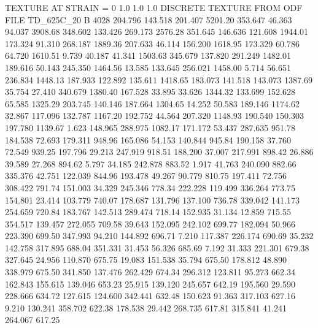 TEXTURE AT STRAIN = 0
1.0   1.0   1.0
DISCRETE TEXTURE FROM ODF FILE TD_625C_20
B 4028
 204.796  143.518  201.407      5201.20
 353.647   46.363   94.037      3908.68
 348.602  133.426  269.173      2576.28
 351.645  146.636  121.608      1944.01
 173.324   91.310  268.187      1889.36
 207.633   46.114  156.200      1618.95
 173.329   60.786   64.720      1610.51
   9.739   40.187   41.341      1503.63
 345.679  137.820  291.249      1482.01
 189.616   50.143  245.350      1464.56
  13.585  133.645  256.021      1458.00
   5.714   56.651  236.834      1448.13
 187.933  122.892  135.611      1418.65
 183.073  141.518  143.073      1387.69
  35.754   27.410  340.679      1380.40
 167.528   33.895   33.626      1344.32
 133.699  152.628   65.585      1325.29
 203.745  140.146  187.664      1304.65
  14.252   50.583  189.146      1174.62
  32.867  117.096  132.787      1167.20
 192.752   44.564  207.320      1148.93
 190.540  150.303  197.780      1139.67
   1.623  148.965  288.975      1082.17
 171.172   53.437  287.635       951.78
 184.538   72.693  179.311       948.96
 165.086   54.153  140.844       945.84
 190.158   37.760   72.549       939.25
 197.796   29.213  247.919       918.51
 188.200   37.007  217.991       898.42
  26.886   39.589   27.268       894.62
   5.797   34.185  242.878       883.52
   1.917   41.763  240.090       882.66
 335.376   42.751  122.039       844.96
 193.478   49.267   90.779       810.75
 197.411   72.756  308.422       791.74
 151.003   34.329  245.346       778.34
 222.228  119.499  336.264       773.75
 154.801   23.414  103.779       740.07
 178.687  131.796  137.100       736.78
 339.042  141.173  254.659       720.84
 183.767  142.513  289.474       718.14
 152.935   31.134   12.859       715.55
 354.517  139.457  272.055       709.58
  39.643  152.095  242.102       699.77
 182.094   50.966  223.390       699.50
 347.993   94.210  144.892       696.71
   7.210  117.387  226.174       690.69
  35.232  142.758  317.895       688.04
 351.331   31.453   56.326       685.69
   7.192   31.333  221.301       679.38
 327.645   24.956  110.870       675.75
  19.083  151.538   35.794       675.50
 178.812   48.890  338.979       675.50
 341.850  137.476  262.429       674.34
 296.312  123.811   95.273       662.34
 162.843  155.615  139.046       653.23
  25.915  139.120  245.657       642.19
 195.560   29.590  228.666       634.72
 127.615  124.600  342.441       632.48
 150.623   91.363  317.103       627.16
   9.210  130.241  358.702       622.38
 178.538   29.442  268.735       617.81
 315.841   41.241  264.067       617.25
